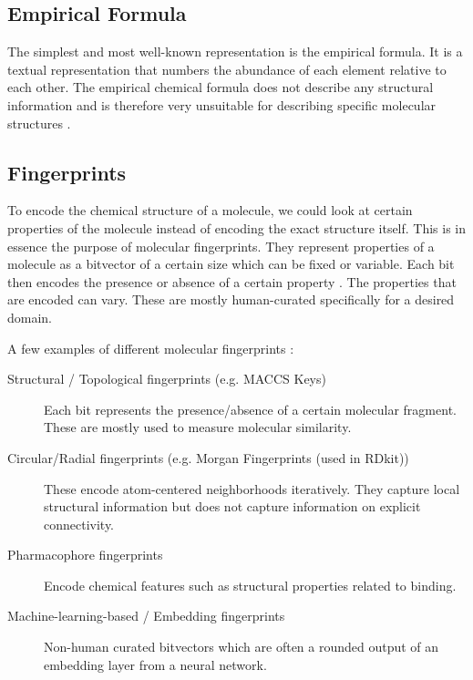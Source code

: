 \subsection{Empirical Formula}

The simplest and most well-known representation is the empirical formula. It is a textual representation that numbers the abundance of each element relative to each other. The empirical chemical formula does not describe any structural information and is therefore very unsuitable for describing specific molecular structures \cite{hartshorn2015brief}.

\subsection{Fingerprints}

To encode the chemical structure of a molecule, we could look at certain properties of the molecule instead of encoding the exact structure itself. This is in essence the purpose of molecular fingerprints. They represent properties of a molecule as a bitvector of a certain size which can be fixed or variable. Each bit then encodes the presence or absence of a certain property \cite{kuwahara2021analysis}. The properties that are encoded can vary. These are mostly human-curated specifically for a desired domain.

A few examples of different molecular fingerprints \cite{wigh2022review, kuwahara2021analysis, pharmacorefingerprints}:
\begin{description}
   \item[Structural / Topological fingerprints (e.g. MACCS Keys)]{Each bit represents the presence/absence of a certain molecular fragment. These are mostly used to measure molecular similarity.}
   \item[Circular/Radial fingerprints (e.g. Morgan Fingerprints (used in RDkit))]{These encode atom-centered neighborhoods iteratively. They capture local structural information but does not capture information on explicit connectivity.}
   \item[Pharmacophore fingerprints]{Encode chemical features such as structural properties related to binding.} 
   \item[Machine-learning-based / Embedding fingerprints]{Non-human curated bitvectors which are often a rounded output of an embedding layer from a neural network.}
\end{description}

